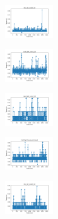 \vspace*{\fill}
\newpage
\vspace*{\fill}

\begin{figure}[H]    
    \centering
    \begin{subfigure}
        \centering
        \includegraphics[width=0.234\textwidth]{img/aggun/iris_set_const_10_949004259_time.png}
    \end{subfigure}
    \hfill
    \begin{subfigure}
        \centering
        \includegraphics[width=0.234\textwidth]{img/aggun/ecoli_set_const_10_949004259_time.png}
    \end{subfigure}
    \hfill
    \begin{subfigure}
        \centering
        \includegraphics[width=0.234\textwidth]{img/aggun/rand_set_const_10_949004259_time.png}
    \end{subfigure}
    \hfill
    \begin{subfigure}
        \centering
        \includegraphics[width=0.234\textwidth]{img/aggun/newthyroid_set_const_10_949004259_time.png}
    \end{subfigure}
    \hfill
    \begin{subfigure}
        \centering
        \includegraphics[width=0.234\textwidth]{img/aggun/iris_set_const_10_589741062_time.png}

\end{subfigure}
\end{figure}
